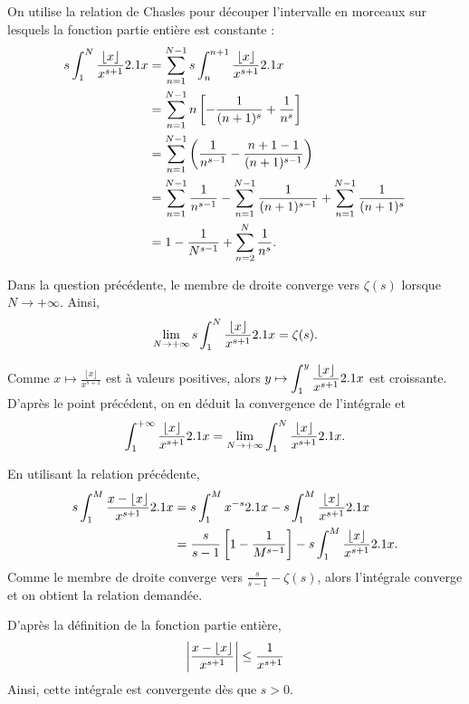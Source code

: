 \begin{solution}
\begin{reponses}
\item On utilise la relation de Chasles pour découper l'intervalle en morceaux sur lesquels la fonction partie entière est constante :
\begin{align*}
s \int_1^N \frac{\lfloor x\rfloor}{x^{s+1}} 2.1 x &= \sum_{n=1}^{N-1} s \int_n^{n+1} \frac{\lfloor x\rfloor}{x^{s+1}} 2.1 x\\
&= \sum_{n=1}^{N-1} n \left[-\frac{1}{(n+1)^s} + \frac{1}{n^s}\right] \\
&= \sum_{n=1}^{N-1} \left(\frac{1}{n^{s-1}} - \frac{n + 1 - 1}{(n+1)^{s-1}}\right) \\
&= \sum_{n=1}^{N-1} \frac{1}{n^{s-1}} - \sum_{n=1}^{N-1} \frac{1}{(n+1)^{s-1}} + \sum_{n=1}^{N-1} \frac{1}{(n+1)^s} \\
&= 1 - \frac{1}{N^{s-1}} + \sum_{n=2}^N \frac{1}{n^s}.
\end{align*}

\item Dans la question précédente, le membre de droite converge vers $\zeta(s)$ lorsque $N \to +\infty$. Ainsi,
\[
\lim_{N\to+\infty} s \int_1^N \frac{\lfloor x\rfloor}{x^{s + 1}} 2.1 x = \zeta(s).
\]

Comme $x \mapsto \frac{\lfloor x\rfloor}{x^{s + 1}}$ est à valeurs positives, alors $y \mapsto \displaystyle\int_1^y \frac{\lfloor x\rfloor}{x^{s + 1}} 2.1 x$ est croissante. D'après le point précédent, on en déduit la convergence de l'intégrale et
\[
\int_1^{+\infty} \frac{\lfloor x\rfloor}{x^{s + 1}} 2.1 x
= \lim_{N\to+\infty} \int_1^N \frac{\lfloor x\rfloor}{x^{s + 1}} 2.1 x.
\]

\item En utilisant la relation précédente,
\begin{align*}
s \int_1^M \frac{x - \lfloor x\rfloor}{x^{s+1}} 2.1 x &= s \int_1^M x^{-s} 2.1 x - s \int_1^M \frac{\lfloor x\rfloor}{x^{s+1}} 2.1 x \\
&= \frac{s}{s-1} \left[1 - \frac{1}{M^{s-1}}\right] - s \int_1^M \frac{\lfloor x\rfloor}{x^{s+1}} 2.1 x.
\end{align*}
Comme le membre de droite converge vers $\frac{s}{s-1} - \zeta(s)$, alors l'intégrale converge et on obtient la relation demandée.

\item D'après la définition de la fonction partie entière,
\[
\abs{\frac{x-\lfloor x\rfloor}{x^{s+1}}} \leq \frac{1}{x^{s+1}}
\]
Ainsi, cette intégrale est convergente dès que $s > 0$.
\end{reponses}
\end{solution}